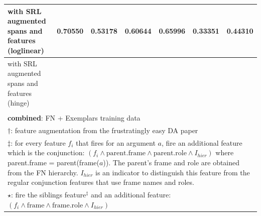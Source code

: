 \documentclass[11pt,a4paper]{article}
\begin{document}
\begin{table}
\begin{small}
\begin{tabular}{|l|c|c|c|c|c|c|}
 with SRL augmented spans and features (loglinear) & 0.70550 & 0.53178 & 0.60644 & 0.65996 & 0.33351 & 0.44310 \\ \hline
 with SRL augmented spans and features (hinge) & & & & & & \\ \hline
 \multicolumn{7}{l}{}\\
 \multicolumn{7}{l}{\textbf{combined}: FN + Exemplars training data}\\ \hline
 \multicolumn{7}{l}{$\dagger$: feature augmentation from the frustratingly easy DA paper}\\ \hline
 \multicolumn{7}{p{14cm}}{$\ddagger$: for every feature $f_i$ that fires for an argument $a$, fire an additional feature which is the conjunction: $(f_i \wedge \textrm{parent.frame} \wedge \textrm{parent.role} \wedge I_{hier})$ where parent.frame = parent(frame($a$)). The parent's frame and role are obtained from the FN hierarchy. $I_{hier}$ is an indicator to distinguish this feature from the regular conjunction features that use frame names and roles.}\\ \hline
 \multicolumn{7}{p{14cm}}{$\star$: fire the siblings feature$^\ddagger$ and an additional feature: $(f_i \wedge \textrm{frame} \wedge \textrm{frame.role} \wedge I_{hier})$}\\ \hline
 \end{tabular}
 \end{small}
 \end{table}
\end{document}
